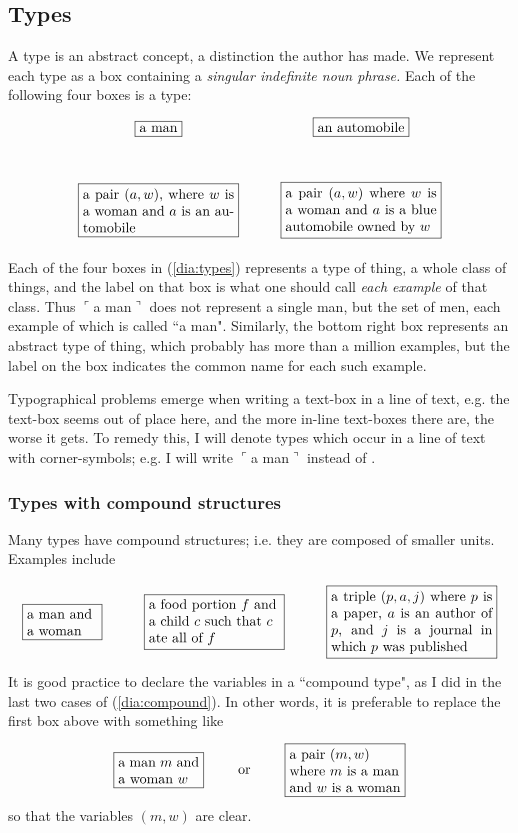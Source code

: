 \documentclass{book}
\def\tn{\textnormal}
\def\hsp{\hspace{.3in}}
\def\rr{\raggedright}
\newcommand{\obox}[3]{\stackrel{#1}{\fbox{\parbox{#2}{#3}}}}
\newcommand{\labox}[2]{\obox{#1}{1.6in}{#2}}
\newcommand{\fakebox}[1]{\tn{$\ulcorner$#1$\urcorner$}}
\theoremstyle{remark}
\theoremstyle{definition}
\begin{document}

\subsection{Types}

A type is an abstract concept, a distinction the author has made.  We represent each type as a box containing a {\em singular indefinite noun phrase.}   Each of the following four boxes is a type: \begin{align}\label{dia:types}\xymatrixnocompile{\fbox{a man}&\fbox{an automobile}\\\obox{}{1.5in}{a pair $(a,w)$, where $w$ is a woman and $a$ is an automobile}&\obox{}{1.5in}{a pair $(a,w)$ where $w$ is a woman and $a$ is a blue automobile owned by $w$}}\end{align}

Each of the four boxes in (\ref{dia:types}) represents a type of thing, a whole class of things, and the label on that box is what one should call {\em each example} of that class.  Thus \fakebox{a man} does not represent a single man, but the set of men, each example of which is called ``a man".  Similarly, the bottom right box represents an abstract type of thing, which probably has more than a million examples, but the label on the box indicates the common name for each such example.  

Typographical problems emerge when writing a text-box in a line of text, e.g. the text-box  seems out of place here, and the more in-line text-boxes there are, the worse it gets.  To remedy this, I will denote types which occur in a line of text with corner-symbols; e.g. I will write \fakebox{a man} instead of .


\subsubsection{Types with compound structures}

Many types have compound structures; i.e. they are composed of smaller units.  Examples include \begin{align}\label{dia:compound}\xymatrixnocompile{\obox{}{.7in}{\rr a man and a woman}&\obox{}{1.3in}{\rr a food portion $f$ and a child $c$ such that $c$ ate all of $f$}&\labox{}{a triple $(p,a,j)$ where $p$ is a paper, $a$ is an author of $p$, and $j$ is a journal in which $p$ was published}}\end{align}  It is good practice to declare the variables in a ``compound type", as I did in the last two cases of (\ref{dia:compound}).  In other words, it is preferable to replace the first box above with something like $$\obox{}{.8in}{a man $m$ and a woman $w$}\hsp\tn{or}\hsp\obox{}{1.1in}{\rr a pair $(m,w)$ where $m$ is a man and $w$ is a woman}$$ so that the variables $(m,w)$ are clear.
\end{document}
